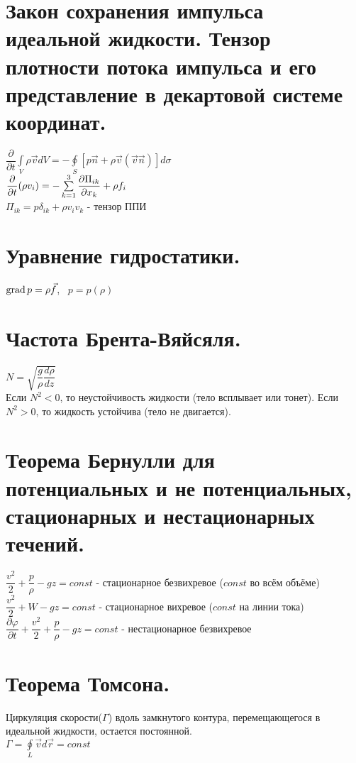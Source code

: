 \begin{multicols*}{2}
		\section{Закон сохранения импульса идеальной жидкости. Тензор плотности потока импульса и его представление в декартовой системе координат.}
		$ \dfrac{\partial}{\partial t}\int\limits_V \rho\vec{v}dV=-\oint\limits_S \left[p\vec{n}+\rho\vec{v}(\vec{v}\vec{n})\right]d\sigma$ \\
		$ \dfrac{\partial}{\partial t}(\rho v_i)=-\sum\limits_{k=1}^3\dfrac{\partial \Pi_{ik}}{\partial x_k}+\rho f_i $ \\
		$ \Pi_{ik} = p\delta_{ik}+\rho v_iv_k$ - тензор ППИ
		
		\section{Уравнение гидростатики.}
		$\operatorname{grad} p=\rho\vec{f}$,~
		$p=p(\rho)$
		
		\section{Частота Брента-Вяйсяля.}
		$N=\sqrt{\dfrac{g}{\rho}\dfrac{d\rho}{dz}}$\\
		Если $N^2<0$, то неустойчивость жидкости (тело всплывает или тонет). Если $N^2>0$, то жидкость устойчива (тело не двигается).
		
		\section{Теорема Бернулли для потенциальных и не потенциальных, стационарных и нестационарных течений.} 
		$\dfrac{v^2}{2}+\dfrac{p}{\rho}-gz=const$ - стационарное безвихревое ($const$ во всём объёме)\\
		$\dfrac{v^2}{2}+W-gz=const$ - стационарное вихревое ($const$ на линии тока)\\
		$\dfrac{\partial \varphi}{\partial t}+\dfrac{v^2}{2}+\dfrac{p}{\rho}-gz=const$ - нестационарное безвихревое \\
		
		\section{Теорема Томсона.}
		Циркуляция скорости($\Gamma$) вдоль замкнутого контура, перемещающегося в идеальной жидкости, остается постоянной. \\
		$\Gamma = \oint\limits_L\vec{v}d\vec{r}=const$
		

\end{multicols*}

